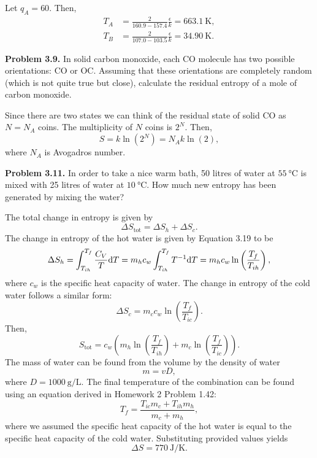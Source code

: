 \documentclass[a4paper, 12pt]{config/homework}
\begin{document}
\noindent
Let \(q_A=60\). Then,
\begin{align*}
T_A &= \frac{2}{160.9 - 157.4}\frac{\epsilon}{k} = \qty{663.1}{\kelvin}, \\
T_B &= \frac{2}{107.0 - 103.5}\frac{\epsilon}{k} = \qty{34.90}{\kelvin}.
\end{align*}


\bigskip
\noindent
\textbf{Problem 3.9.} In solid carbon monoxide, each CO molecule has two possible orientations: CO or OC. Assuming that these orientations are completely random (which is not quite true but close), calculate the residual entropy of a mole of carbon monoxide.

\noindent
Since there are two states we can think of the residual state of solid CO as \(N=N_A\) coins. The multiplicity of \(N\) coins is \(2^N\). Then,
\[S = k\ln\left(2^N\right) = N_A k \ln(2),\]
where \(N_A\) is Avogadros number.


\pagebreak
\noindent
\textbf{Problem 3.11.} In order to take a nice warm bath, 50 litres of water at \(\qty{55}{\celsius}\) is mixed with 25 litres of water at \(\qty{10}{\celsius}\). How much new entropy has been generated by mixing the water?

\noindent
The total change in entropy is given by
\[\Delta S_\text{tot} = \Delta S_h + \Delta S_c.\]
The change in entropy of the hot water is given by Equation 3.19 to be
\[\Delta S_h = \int_{T_{ih}}^{T_f}{\frac{C_V}{T} \text{d}T} = m_h c_w \int_{T_{ih}}^{T_f}{T^{-1} \text{d}T} = m_h c_w\ln\left(\frac{T_f}{T_{ih}}\right),\]
where \(c_w\) is the specific heat capacity of water. The change in entropy of the cold water follows a similar form:
\[\Delta S_c = m_c c_w \ln\left(\frac{T_f}{T_{ic}}\right).\]
Then,
\[S_\text{tot} = c_w \left(m_h \ln\left(\frac{T_f}{T_{ih}}\right) + m_c \ln\left(\frac{T_f}{T_{ic}}\right)\right).\]
The mass of water can be found from the volume by the density of water
\[m = vD,\]
where \(D=\qty{1000}{\gram\per\liter}\). The final temperature of the combination can be found using an equation derived in Homework 2 Problem 1.42:
\[T_f = \frac{T_{ic}m_c + T_{ih}m_h}{m_c + m_h},\]
where we assumed the specific heat capacity of the hot water is equal to the specific heat capacity of the cold water. Substituting provided values yields
\[\Delta S = \qty{770}{\joule\per\kelvin}.\]
\end{document}
